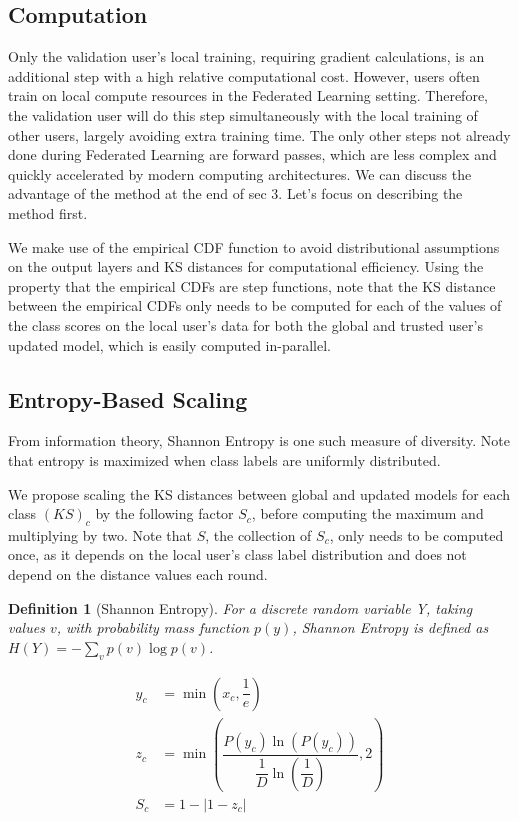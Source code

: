 \documentclass{article} %
\newtheorem{definition}{Definition}
\newcommand{\yli}[1]{{\color{cyan}#1}}
\begin{document}
\subsection{Computation}
Only the validation user's local training, requiring gradient calculations, is an additional step with a high relative computational cost. However, users often train on local compute resources in the Federated Learning setting. Therefore, the validation user will do this step simultaneously with the local training of other users, largely avoiding extra training time. The only other steps not already done during Federated Learning are forward passes, which are less complex and quickly accelerated by modern computing architectures. \yli{We can discuss the advantage of the method at the end of sec 3. Let's focus on describing the method first.}

We make use of the empirical CDF function to avoid distributional assumptions on the output layers and KS distances for computational efficiency. Using the property that the empirical CDFs are step functions, note that the KS distance between the empirical CDFs only needs to be computed for each of the values of the class scores on the local user's data for both the global and trusted user's updated model, which is easily computed in-parallel.

%
\subsection{Entropy-Based Scaling}
From information theory, Shannon Entropy is one such measure of diversity. Note that entropy is maximized when class labels are uniformly distributed. 

We propose scaling the KS distances between global and updated models for each class $(KS)_c$ by the following factor $S_c$, before computing the maximum and multiplying by two. Note that $S$, the collection of $S_c$, only needs to be computed once, as it depends on the local user's class label distribution and does not depend on the distance values each round.

\begin{definition}[Shannon Entropy] For a discrete random variable Y, taking values $v$, with probability mass function $p(y)$, Shannon Entropy is defined as $H(Y) = - \sum_{v} p(v) \log p(v)$.
    
\end{definition}

\begin{align}
    y_c &= \min \left( x_c, \dfrac{1}{e} \right) \\
    z_c &= \min \left( \dfrac{P(y_c) \ln \left( P(y_c) \right)}{\dfrac{1}{D} \ln \left( \dfrac{1}{D} \right)}, 2 \right) \\
    S_c &= 1 - | 1 - z_c |    
\end{align}
\end{document}
